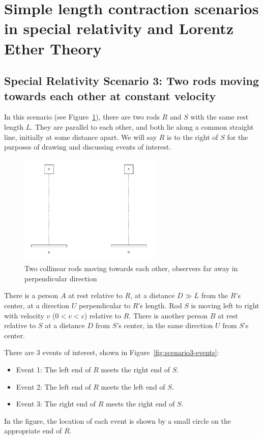 \documentclass[a4paper]{article}
\theoremstyle{plain}
\theoremstyle{definition}
\begin{document}
\section{Simple length contraction scenarios in special relativity and Lorentz Ether Theory}
\label{sec:simple-sr-length-contraction}


\subsection{Special Relativity Scenario 3: Two rods moving towards each other at constant velocity}
\label{sec:scen3}

In this scenario (see Figure~\ref{fig:scenario3-setup}), there are two
rods $R$ and $S$ with the same rest length $L$.  They are parallel to
each other, and both lie along a common straight line, initially at
some distance apart.  We will say $R$ is to the right of $S$ for the
purposes of drawing and discussing events of interest.

\begin{figure}[ht]
	\centering
	\includegraphics[width=0.6\textwidth]{scenario3-setup-cropped.pdf}
	\caption{Two collinear rods moving towards each other, observers far away in perpendicular direction}
	\label{fig:scenario3-setup}
\end{figure}

There is a person $A$ at rest relative to $R$, at a distance $D \gg L$
from the $R$'s center, at a direction $U$ perpendicular to $R$'s
length.  Rod $S$ is moving left to right with velocity $v$
($0 < v < c$) relative to $R$.  There is another person $B$ at rest
relative to $S$ at a distance $D$ from $S$'s center, in the same
direction $U$ from $S$'s center.

There are 3 events of interest, shown in Figure~\ref{fig:scenario3-events}:
\begin{itemize}
\item Event 1: The left end of $R$ meets the right end of $S$.
\item Event 2: The left end of $R$ meets the left end of $S$.
\item Event 3: The right end of $R$ meets the right end of $S$.
\end{itemize}
In the figure, the location of each event is shown by a small circle
on the appropriate end of $R$.
\end{document}

